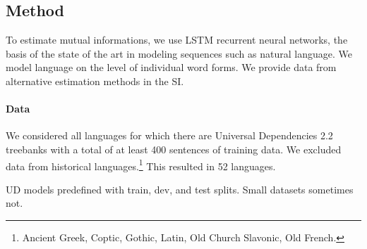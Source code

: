 \documentclass[11pt,letterpaper]{article}
\begin{document}
\subsection{Method}
%
%
%
%
%
%
%
%
%
%

To estimate mutual informations, we use LSTM recurrent neural networks, the basis of the state of the art in modeling sequences such as natural language.
We model language on the level of individual word forms.
We provide data from alternative estimation methods in the SI.


\paragraph{Data}


We considered all languages for which there are Universal Dependencies 2.2 treebanks with a total of at least 400 sentences of training data.
We excluded data from historical languages.\footnote{Ancient Greek, Coptic, Gothic, Latin, Old Church Slavonic, Old French.}
This resulted in 52 languages.


UD models predefined with train, dev, and test splits.
Small datasets sometimes not.
\end{document}
